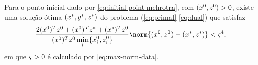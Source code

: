 
\begin{cond} \label{cond:xzzero-xzstar} Para o ponto inicial dado por \eqref{eq:initial-point-mehrotra}, com $(x^0,z^0)>0$,  existe uma solução ótima $(x^*,y^*,z^*)$  do problema (\ref{eq:primal}-\ref{eq:dual}) que satisfaz 
\begin{equation}
	 	\label{eq:cond:xzzero-xzstar}
	 		\dfrac{2(\xzero)^T\zzero  + (\xzero)^T\zstar + (\xstar)^T\zzero}{(\xzero)^T\zzero \minxzinit} \norm{(\xzero,\zzero) - (\xstar,\zstar)} < \bdxzstar^{4},
\end{equation}
em que  $\varsigma>0$ é calculado por \eqref{eq:max-norm-data}. 
\end{cond}









